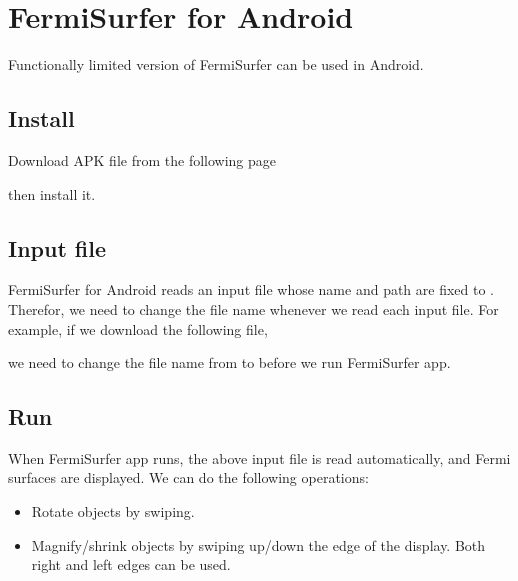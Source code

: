 \documentclass[letterpaper,10pt,pdftex,openany,english]{sphinxmanual}
\begin{document}
\sphinxstepscope


\chapter{FermiSurfer for Android}
\label{\detokenize{android:fermisurfer-for-android}}\label{\detokenize{android::doc}}
\sphinxAtStartPar
Functionally limited version of FermiSurfer can be used in Android.


\section{Install}
\label{\detokenize{android:install}}
\sphinxAtStartPar
Download APK file from the following page

\sphinxAtStartPar
{}

\sphinxAtStartPar
then install it.


\section{Input file}
\label{\detokenize{android:input-file}}
\sphinxAtStartPar
FermiSurfer for Android reads an input file whose name and path are fixed to
.
Therefor, we need to change the file name whenever we read each input file.
For example, if we download the following file,

\sphinxAtStartPar
{}

\sphinxAtStartPar
we need to change the file name from  to  before we run
FermiSurfer app.


\section{Run}
\label{\detokenize{android:run}}
\sphinxAtStartPar
When FermiSurfer app runs, the above input file is read automatically,
and Fermi surfaces are displayed.
We can do the following operations:
\begin{itemize}
\item {} 
\sphinxAtStartPar
Rotate objects by swiping.

\item {} 
\sphinxAtStartPar
Magnify/shrink objects by swiping up/down the edge of the display. Both right and left edges can be used.

\end{itemize}
\end{document}
